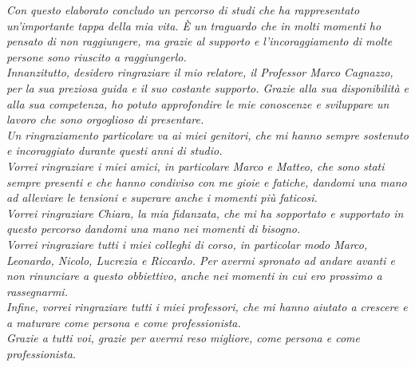 \begin{flushleft}
    \textit{
    Con questo elaborato concludo un percorso di studi che ha rappresentato un'importante tappa della mia vita. È un traguardo che in molti momenti ho pensato di non raggiungere, ma grazie al supporto e l’incoraggiamento di molte persone sono riuscito a raggiungerlo.\\
    Innanzitutto, desidero ringraziare il mio relatore, il Professor Marco Cagnazzo, per la sua preziosa guida e il suo costante supporto. Grazie alla sua disponibilità e alla sua competenza, ho potuto approfondire le mie conoscenze e sviluppare un lavoro che sono orgoglioso di presentare.\\
    Un ringraziamento particolare va ai miei genitori, che mi hanno sempre sostenuto e incoraggiato durante questi anni di studio.\\
    Vorrei ringraziare i miei amici, in particolare Marco e Matteo, che sono stati sempre presenti e che hanno condiviso con me gioie e fatiche, dandomi una mano ad alleviare le tensioni e superare anche i momenti più faticosi.\\
    Vorrei ringraziare Chiara, la mia fidanzata, che mi ha sopportato e supportato in questo percorso dandomi una mano nei momenti di bisogno.\\
    Vorrei ringraziare tutti i miei colleghi di corso, in particolar modo Marco, Leonardo, Nicolo, Lucrezia e Riccardo. Per avermi spronato ad andare avanti e non rinunciare a questo obbiettivo, anche nei momenti in cui ero prossimo a rassegnarmi.\\
    Infine, vorrei ringraziare tutti i miei professori, che mi hanno aiutato a crescere e a maturare come persona e come professionista.\\
    Grazie a tutti voi, grazie per avermi reso migliore, come persona e come professionista.}
\end{flushleft}
